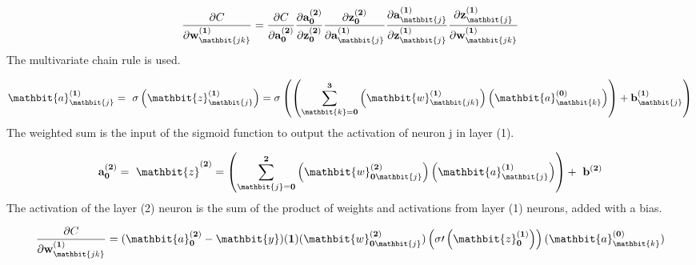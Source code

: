 \documentclass[12pt,a4paper]{article}
\begin{document}
\begin{equation}
\frac{\partial C}{\partial\mathbf{w}_{\mathbit{jk}}^{\left(\mathbf{1}\right)}}=\frac{\partial C}{\partial\mathbf{a}_\mathbf{0}^{(\mathbf{2})}}\frac{\partial\mathbf{a}_\mathbf{0}^{(\mathbf{2})}}{\partial\mathbf{z}_\mathbf{0}^{\left(\mathbf{2}\right)}}\frac{\partial\mathbf{z}_\mathbf{0}^{\left(\mathbf{2}\right)}}{\partial\mathbf{a}_\mathbit{j}^{\left(\mathbf{1}\right)}}\frac{\partial\mathbf{a}_\mathbit{j}^{\left(\mathbf{1}\right)}}{\partial\mathbf{z}_\mathbit{j}^{\left(\mathbf{1}\right)}}\frac{\partial\mathbf{z}_\mathbit{j}^{\left(\mathbf{1}\right)}}{\partial\mathbf{w}_{\mathbit{jk}}^{\left(\mathbf{1}\right)}}
\end{equation}
The multivariate chain rule is used.



\begin{equation}
\mathbit{a}_\mathbit{j}^{\left(\mathbf{1}\right)}=\ \mathbf{\sigma}\left(\mathbit{z}_\mathbit{j}^{\left(\mathbf{1}\right)}\right) = \mathbf{\sigma}\left(\left(\sum_{\mathbit{k}=\mathbf{0}}^{\mathbf{3}}\left(\mathbit{w}_{\mathbit{jk}}^{\left(\mathbf{1}\right)}\right)\left(\mathbit{a}_\mathbit{k}^{\left(\mathbf{0}\right)}\right)\right)+\mathbf{b}_\mathbit{j}^{\left(\mathbf{1}\right)}\right)	
\end{equation}
The weighted sum is the input of the sigmoid function to output the activation of neuron j in layer (1).



\begin{equation}
{\mathbf{a}_\mathbf{0}^{(\mathbf{2})}=\ \mathbit{z}}^{\left(\mathbf{2}\right)}=\left(\sum_{\mathbit{j}=\mathbf{0}}^{\mathbf{2}}\left(\mathbit{w}_{\mathbf{0}\mathbit{j}}^{\left(\mathbf{2}\right)}\right)\left(\mathbit{a}_\mathbit{j}^{\left(\mathbf{1}\right)}\right)\right)+\ \mathbf{b}^{\left(\mathbf{2}\right)}	
\end{equation}
The activation of the layer (2) neuron is the sum of the product of weights and activations from layer (1) neurons, added with a bias.



\begin{equation}
\frac{\partial C}{\partial\mathbf{w}_{\mathbit{jk}}^{\left(\mathbf{1}\right)}}={(\mathbit{a}}_\mathbf{0}^{\left(\mathbf{2}\right)}-\mathbit{y})(\mathbf{1})(\mathbit{w}_{\mathbf{0}\mathbit{j}}^{\left(\mathbf{2}\right)})\left(\mathbf{\sigma}\prime\left(\mathbit{z}_\mathbf{0}^{\left(\mathbf{1}\right)}\right)\right)(\mathbit{a}_\mathbit{k}^{\left(\mathbf{0}\right)})	
\end{equation}
\end{document}
